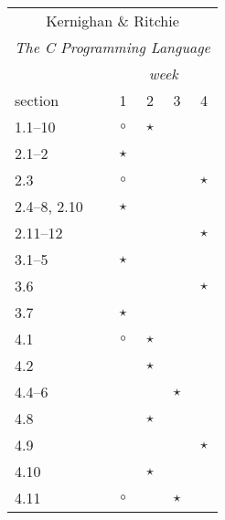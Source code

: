 \documentclass[a4paper]{article}
\begin{document}
\begin{table}
  \footnotesize
  \centering
  \begin{tabular}{|l|c|c|c|c|}
    \hline
    \multicolumn{5}{|c|}{Kernighan \& Ritchie} \\
    \multicolumn{5}{|c|}{\emph{The C Programming Language}} \\
    \hline
                       & \multicolumn{4}{|c|}{\emph{week}} \\
    section            & 1       & 2       & 3       & 4 \\
    \hline
    1.1--10            & $\circ$ & $\star$ &         & \\
    \hline
    2.1--2             & $\star$ &         &         & \\
    2.3                & $\circ$ &         &         & $\star$ \\
    2.4--8, 2.10       & $\star$ &         &         & \\
    2.11--12           &         &         &         & $\star$ \\
    \hline
    3.1--5             & $\star$ &         &         & \\
    3.6                &         &         &         & $\star$ \\
    3.7                & $\star$ &         &         & \\
    \hline
    4.1                & $\circ$ & $\star$ &         & \\
    4.2                &         & $\star$ &         & \\
    4.4--6             &         &         & $\star$ & \\
    4.8                &         & $\star$ &         & \\
    4.9                &         &         &         & $\star$ \\
    4.10               &         & $\star$ &         & \\
    4.11               & $\circ$ &         & $\star$ & \\
    \hline

\end{tabular}
\end{table}
\end{document}
